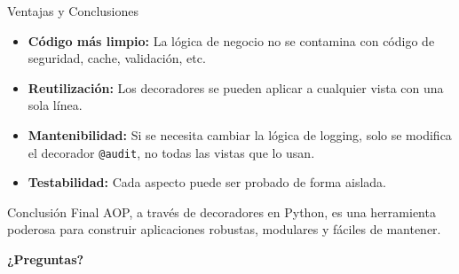 \documentclass[spanish]{beamer}
\begin{document}
\begin{frame}{Ventajas y Conclusiones}
    \begin{itemize}
        \item<1-> \textbf{Código más limpio:} La lógica de negocio no se contamina con código de seguridad, cache, validación, etc.
        \item<2-> \textbf{Reutilización:} Los decoradores se pueden aplicar a cualquier vista con una sola línea.
        \item<3-> \textbf{Mantenibilidad:} Si se necesita cambiar la lógica de logging, solo se modifica el decorador \texttt{@audit}, no todas las vistas que lo usan.
        \item<4-> \textbf{Testabilidad:} Cada aspecto puede ser probado de forma aislada.
    \end{itemize}
    \vfill
    \begin{alertblock}{Conclusión Final}
        AOP, a través de decoradores en Python, es una herramienta poderosa para construir aplicaciones robustas, modulares y fáciles de mantener.
    \end{alertblock}
\end{frame}

\begin{frame}
    \begin{center}
        \Huge\bfseries ¿Preguntas?
    \end{center}
\end{frame}
\end{document}

